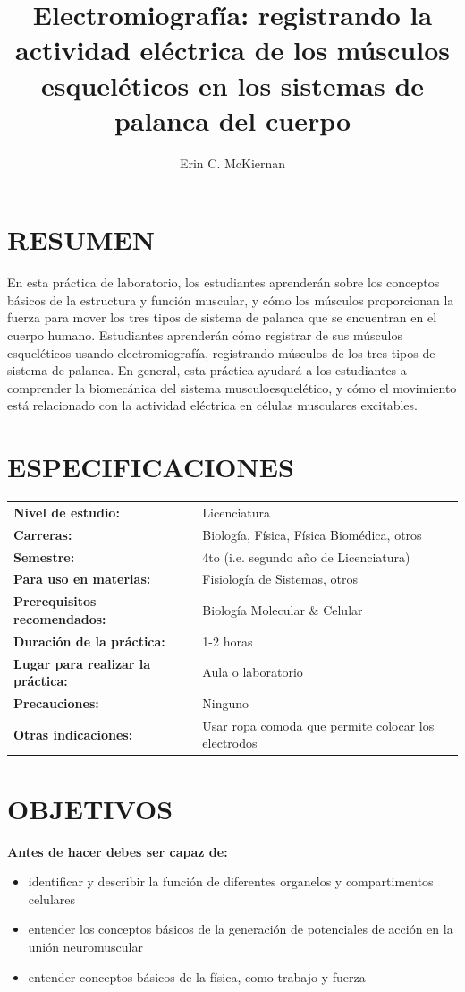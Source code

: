 \documentclass[12pt]{article}
\title{\vspace{-1.8cm}\Large{\textbf{Electromiografía: registrando la
      actividad eléctrica de los músculos esqueléticos en los sistemas de palanca
      del cuerpo}}}
\author[1]{Erin C. McKiernan}
\affil[1]{\small{Departamento de F\'isica, Facultad de Ciencias,
    Universidad Nacional Aut\'onoma de M\'exico}}
\date{}
\begin{document}
\maketitle


\section*{RESUMEN}

En esta práctica de laboratorio, los estudiantes aprenderán sobre los
conceptos básicos de la estructura y función muscular, y cómo los
músculos proporcionan la fuerza para mover los tres tipos de sistema
de palanca que se encuentran en el cuerpo humano. Estudiantes
aprenderán cómo registrar de sus músculos esqueléticos usando
electromiografía, registrando músculos de los tres tipos de
sistema de palanca. En general, esta práctica ayudará a los
estudiantes a comprender la biomecánica del sistema
musculoesquelético, y cómo el movimiento está relacionado con la
actividad eléctrica en células musculares excitables.


\section*{ESPECIFICACIONES}
\begin{tabular}{p{6cm} p{10cm}}
\textbf{Nivel de estudio:} & Licenciatura \\
\textbf{Carreras:} & Biología, Física, Física Biomédica, otros \\
\textbf{Semestre:} & 4to (i.e. segundo año de Licenciatura) \\ 
\textbf{Para uso en materias:} & Fisiología de Sistemas, otros \\
\textbf{Prerequisitos recomendados:} & Biología Molecular \& Celular \\
\textbf{Duración de la práctica:} & 1-2 horas \\
\textbf{Lugar para realizar la práctica:} & Aula o laboratorio \\
\textbf{Precauciones:} & Ninguno \\
\textbf{Otras indicaciones:} & Usar ropa comoda que permite colocar los electrodos
\end{tabular}

\section*{OBJETIVOS}
\textbf{Antes de hacer debes ser capaz de:}
\begin{itemize}
\item identificar y describir la función de diferentes organelos y compartimentos celulares
\item entender los conceptos básicos de la generación de potenciales de
  acción en la unión neuromuscular
\item entender conceptos básicos de la física, como trabajo y fuerza 
\end{itemize}
 
\end{document}
